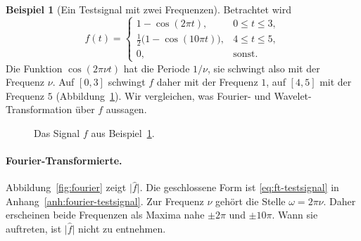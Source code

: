 \documentclass[a4paper,11pt,bibliography=totoc,listof=totoc,headinclude=true,cleardoublepage=empty,oneside]{scrbook}
\theoremstyle{plain}
\theoremstyle{definition}
\newtheorem{Beispiel}[Satz]{Beispiel}
\begin{document}
\begin{Beispiel}[Ein Testsignal mit zwei Frequenzen]
\label{bsp:testsignal}
Betrachtet wird
\[
  f(t)=
  \begin{cases}
    1-\cos(2\pi t),                      & 0\le t\le 3,\\
    \tfrac12\bigl(1-\cos(10\pi t)\bigr), & 4\le t\le 5,\\
    0,                                   & \text{sonst.}
  \end{cases}
\]
Die Funktion $\cos(2\pi\nu t)$ hat die Periode $1/\nu$, sie schwingt also mit der
Frequenz $\nu$. Auf $[0,3]$ schwingt $f$ daher mit der Frequenz $1$, auf $[4,5]$
mit der Frequenz $5$ (Abbildung~\ref{fig:signal}). Wir vergleichen, was
Fourier- und Wavelet-Transformation über $f$ aussagen.

\begin{figure}[htbp]
  \centering
  \caption{Das Signal $f$ aus Beispiel~\ref{bsp:testsignal}.}
  \label{fig:signal}
\end{figure}

\paragraph{Fourier-Transformierte.}
Abbildung~\ref{fig:fourier} zeigt $\lvert\hat f\rvert$. Die geschlossene Form
ist \eqref{eq:ft-testsignal} in Anhang~\ref{anh:fourier-testsignal}. Zur
Frequenz $\nu$ gehört die Stelle $\omega = 2\pi\nu$. Daher erscheinen beide
Frequenzen als Maxima nahe $\pm2\pi$ und $\pm10\pi$. Wann sie auftreten, ist
$\lvert\hat f\rvert$ nicht zu entnehmen.


\end{Beispiel}
\end{document}
